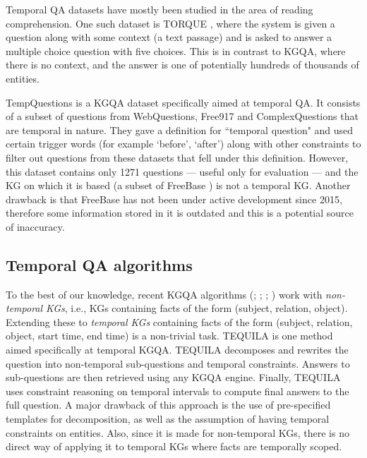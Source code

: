 \documentclass[11pt,a4paper]{article}
\begin{document}
Temporal QA datasets have mostly been studied in the area of reading comprehension. One such dataset is TORQUE \citep{ning2020torque}, where the system is given a question along with some context (a text passage) and is asked to answer a multiple choice question with five choices. This is in contrast to KGQA, where there is no context, and the answer is one of potentially hundreds of thousands of entities.

TempQuestions \citep{tempquestions2018} is a KGQA dataset specifically aimed at temporal QA. It consists of a subset of questions from Web\-Questions, Free917 \citep{cai-yates-2013-large} and Complex\-Questions \citep{bao-etal-2016-constraint} that are temporal in nature. They gave a definition for ``temporal question" and used certain trigger words (for example `before', `after') along with other constraints to filter out questions from these datasets that fell under this definition. However, this dataset contains only 1271 questions --- useful only for evaluation --- and the KG on which it is based (a subset of FreeBase \citep{freebase2008}) is not a temporal KG. Another drawback is that FreeBase has not been under active development since 2015, therefore some information stored in it is outdated and this is a potential source of inaccuracy.




\subsection{Temporal QA algorithms}

To the best of our knowledge, recent KGQA algorithms (\citealt{miller2016kvmnet}; \citealt{sun2019pullnet}; \citealt{cohen2020scalable}; \citealt{sun2020faithful}) work with \textit{non-temporal KGs}, i.e., KGs containing facts of the form (subject, relation, object). Extending these to \textit{temporal KGs} containing facts of the form (subject, relation, object, start time, end time) is a non-trivial task. TEQUILA \citep{Jia_2018} is one method aimed specifically at temporal KGQA. TEQUILA decomposes and rewrites the question into non-temporal sub-questions and temporal constraints. Answers to sub-questions are then retrieved using any KGQA engine. Finally, TEQUILA uses constraint reasoning on temporal intervals to compute final answers to the full question. A major drawback of this approach is the use of pre-specified templates for decomposition, as well as the assumption of having temporal constraints on entities. Also, since it is made for non-temporal KGs, there is no direct way of applying it to temporal KGs where facts are temporally scoped.
\end{document}
